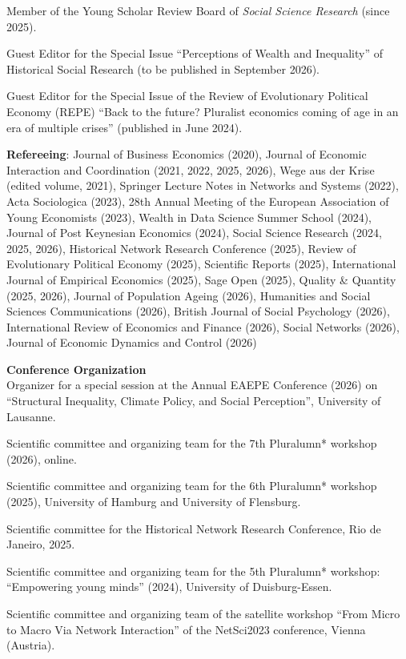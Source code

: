 \documentclass[margin]{res}
\begin{document}
\begin{resume}
	Member of the Young Scholar Review Board of \textit{Social Science Research} (since 2025).
	
	Guest Editor for the Special Issue ``Perceptions of Wealth and Inequality'' of Historical Social Research (to be published in September 2026).
	
	Guest Editor for the Special Issue of the Review of Evolutionary Political Economy (REPE) ``Back to the future? Pluralist economics coming of age in an era of multiple crises'' (published in June 2024).
	
	\textbf{Refereeing}:	Journal of Business Economics (2020), Journal of Economic Interaction and Coordination (2021, 2022, 2025, 2026), Wege aus der Krise (edited volume, 2021), Springer Lecture Notes in Networks and Systems (2022), Acta Sociologica (2023), 28th Annual Meeting of the European Association of Young Economists (2023), Wealth in Data Science Summer School (2024), Journal of Post Keynesian Economics (2024), Social Science Research (2024, 2025, 2026), Historical Network Research Conference (2025), Review of Evolutionary Political Economy (2025), Scientific Reports (2025), International Journal of Empirical Economics (2025), Sage Open (2025), Quality \& Quantity (2025, 2026), Journal of Population Ageing (2026), Humanities and Social Sciences Communications (2026), British Journal of Social Psychology (2026), International Review of Economics and Finance (2026), Social Networks (2026), Journal of Economic Dynamics and Control (2026)
	
	
	\textbf{Conference Organization}\\
	Organizer for a special session at the Annual EAEPE Conference (2026) on ``Structural Inequality, Climate Policy, and Social Perception'', University of Lausanne.
	
	Scientific committee and organizing team for the 7th Pluralumn* workshop (2026), online.
	
	Scientific committee and organizing team for the 6th Pluralumn* workshop (2025), University of Hamburg and University of Flensburg.
	
	Scientific committee for the Historical Network Research Conference, Rio de Janeiro, 2025.
	
	Scientific committee and organizing team for the 5th Pluralumn* workshop: ``Empowering young minds'' (2024), University of Duisburg-Essen.
	
	Scientific committee and organizing team of the satellite workshop ``From Micro to Macro Via Network Interaction'' of the NetSci2023 conference, Vienna (Austria).
	

\end{resume}
\end{document}
